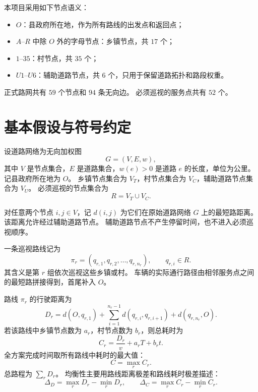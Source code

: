 \documentclass[a4paper, 12pt]{article}
\begin{document}
本项目采用如下节点语义：
\begin{itemize}[leftmargin=2em]
    \item $O$：县政府所在地，作为所有路线的出发点和返回点；
    \item $A$--$R$ 中除 $O$ 外的字母节点：乡镇节点，共 $17$ 个；
    \item $1$--$35$：村节点，共 $35$ 个；
    \item $U1$--$U6$：辅助道路节点，共 $6$ 个，只用于保留道路拓扑和路段权重。
\end{itemize}

正式路网共有 $59$ 个节点和 $94$ 条无向边。
必须巡视的服务点共有 $52$ 个。

\section{基本假设与符号约定}

设道路网络为无向加权图
\begin{equation}
    G=(V,E,w),
\end{equation}
其中 $V$ 是节点集合，$E$ 是道路集合，$w(e)>0$ 是道路 $e$ 的长度，单位为公里。
记县政府所在地为 $O$。
乡镇节点集合为 $V_T$，村节点集合为 $V_C$，辅助道路节点集合为 $V_U$。
必须巡视的节点集合为
\begin{equation}
    R = V_T \cup V_C.
\end{equation}

对任意两个节点 $i,j\in V$，记 $d(i,j)$ 为它们在原始道路网络 $G$ 上的最短路距离。
该距离允许经过辅助道路节点。
辅助道路节点不产生停留时间，也不进入必须巡视顺序。

一条巡视路线记为
\begin{equation}
    \pi_r = (q_{r,1},q_{r,2},\ldots,q_{r,n_r}),\qquad q_{r,i}\in R.
\end{equation}
其含义是第 $r$ 组依次巡视这些乡镇或村。
车辆的实际通行路径由相邻服务点之间的最短路拼接得到，首尾补入 $O$。

路线 $\pi_r$ 的行驶距离为
\begin{equation}
    D_r =
    d(O,q_{r,1})
    + \sum_{i=1}^{n_r-1} d(q_{r,i},q_{r,i+1})
    + d(q_{r,n_r},O).
    \label{eq:route-distance}
\end{equation}
若该路线中乡镇节点数为 $a_r$，村节点数为 $b_r$，则总耗时为
\begin{equation}
    C_r = \frac{D_r}{v} + a_r T + b_r t.
    \label{eq:route-time}
\end{equation}
全方案完成时间取所有路线中耗时的最大值：
\begin{equation}
    C = \max_r C_r.
    \label{eq:completion-time}
\end{equation}
总路程为 $\sum_r D_r$。
均衡性主要用路线距离极差和路线耗时极差描述：
\begin{equation}
    \Delta_D=\max_r D_r-\min_r D_r,\qquad
    \Delta_C=\max_r C_r-\min_r C_r.
\end{equation}
\end{document}
